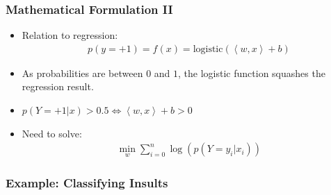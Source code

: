 \begin{frame}
    \frametitle{Mathematical Formulation II}
    \begin{itemize}
        \item Relation to regression:
            \begin{align*}
                p(y=+1) = f(x) = \text{logistic}(\left<w, x\right> + b)
            \end{align*}
        \item As probabilities are between $0$ and $1$, the logistic function
            squashes the regression result.
        \item $p(Y=+1 | x) > 0.5 \Leftrightarrow \left <w, x \right> + b > 0$
        \item Need to solve:
            \begin{align*}
                \min_w \sum_{i=0}^n \log(p(Y=y_i | x_i))
            \end{align*}
    \end{itemize}
\end{frame}


\begin{frame}
    \frametitle{Example: Classifying Insults}
\end{frame}


